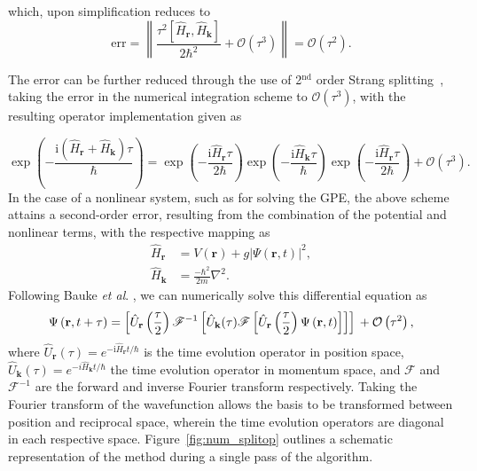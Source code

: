 which, upon simplification reduces to
\begin{equation}
\text{err} = \left\| \frac{\tau^2[{\hat{H}_{\textbf{r}}},{\hat{H}_{\textbf{k}}}]}{2\hbar^2} + \mathcal{O}(\tau^3)\right\| = \mathcal{O}(\tau^2).
\end{equation}

The error can be further reduced through the use of 2$^{\text{nd}}$ order Strang splitting~\cite{NUM:Gradinaru_SIAM_2007}, taking the error in the numerical integration scheme to $\mathcal{O}(\tau^3)$, with the resulting operator implementation given as

\begin{equation}\label{eqn:3}
\exp\left( -\frac{ \textrm{i}\left(\hat{H}_{\textbf{r}} + \hat{H}_{\textbf{k}}\right)\tau}{\hbar} \right) = \exp\left(- \frac{\textrm{i}\hat{H}_{\textbf{r}}\tau}{2\hbar} \right)\exp\left(-\frac{\textrm{i}\hat{H}_{\textbf{k}}\tau}{\hbar}\right)\exp\left( -\frac{\textrm{i}\hat{H}_{\textbf{r}}\tau}{2\hbar}\right) + \mathcal{O}\left(\tau^3\right).
\end{equation}
In the case of a nonlinear system, such as for solving the GPE, the above scheme attains a second-order error, resulting from the combination of the potential and nonlinear terms, with the respective mapping as \cite{BEC:Javanainen_jphysa_2006}
\begin{subequations}
    \begin{align}
\hat{H}_{\textbf{r}} &= V(\mathbf{r}) + g\vert\Psi(\mathbf{r},t)\vert^2, \\ \hat{H}_{\textbf{k}} &= \frac{-\hbar^2}{2m}\nabla^2.
    \end{align}
\end{subequations}
Following Bauke \textit{et al}. \cite{Num:Bauke_cpc_2011}, we can numerically solve this differential equation as
\begin{equation}\label{eqn:baukeetal}
\Psi\left(\textbf{r},t+\tau\right) = \left[\hat{U}_{\mathbf{r}}\left(\frac{\tau}{2}\right) \mathscr{F}^{-1} \left[ \hat{U}_{\mathbf{k}}(\tau) \mathscr{F} \left[ \hat{U}_{\mathbf{r}}\left(\frac{\tau}{2}\right) \Psi\left(\mathbf{r},t\right) \right] \right] \right]  \\ + \mathcal{O}\left(\tau^2\right),
\end{equation}
where $\hat{U}_{\mathbf{r}}(\tau)=e^{-\textrm{i}\hat{H}_{\mathbf{r}}t/\hbar}$ is the time evolution operator in position space, $\hat{U}_{\mathbf{k}}(\tau)=e^{-i\hat{H}_{\mathbf{k}}t/\hbar}$ the time evolution operator in momentum space, and $\mathscr{F}$ and $\mathscr{F}^{-1}$ are the forward and inverse Fourier transform respectively. Taking the Fourier transform of the wavefunction allows the basis to be transformed between position and reciprocal space, wherein the time evolution operators are diagonal in each respective space. Figure~\ref{fig:num_splitop} outlines a schematic representation of the method during a single pass of the algorithm.

